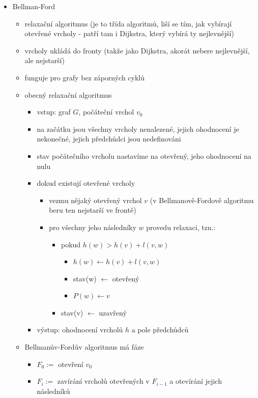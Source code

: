\begin{itemize}
\begin{itemize}
\begin{itemize}
\end{itemize}
\item Bellman-Ford
\begin{itemize}
\item relaxační algoritmus (je to třída algoritmů, liší se tím, jak vybírají otevřené vrcholy - patří tam i Dijkstra, který vybírá ty nejlevnější)
\item vrcholy ukládá do fronty (takže jako Dijkstra, akorát nebere nejlevnější, ale nejstarší)
\item funguje pro grafy bez záporných cyklů
\item obecný relaxační algoritmus
\begin{itemize}
\item vstup: graf $G$, počáteční vrchol $v_0$
\item na začátku jsou všechny vrcholy nenalezené, jejich ohodnocení je nekonečné, jejich předchůdci jsou nedefinováni
\item stav počátečního vrcholu nastavíme na otevřený, jeho ohodnocení na nulu
\item dokud existují otevřené vrcholy
\begin{itemize}
\item vezmu nějaký otevřený vrchol $v$ (v Bellmanově-Fordově algoritmu beru ten nejstarší ve frontě)
\item pro všechny jeho následníky $w$ provedu relaxaci, tzn.:
\begin{itemize}
\item pokud $h(w)\gt h(v)+l(v,w)$
\begin{itemize}
\item $h(w)\leftarrow h(v)+l(v,w)$
\item stav(w) $\leftarrow$ otevřený
\item $P(w)\leftarrow v$
\end{itemize}
\item stav(v) $\leftarrow$ uzavřený
\end{itemize}
\end{itemize}
\item výstup: ohodnocení vrcholů $h$ a pole předchůdců
\end{itemize}
\item Bellmanův-Fordův algoritmus má fáze
\begin{itemize}
\item $F_0:=$ otevření $v_0$
\item $F_i:=$ zavírání vrcholů otevřených v $F_{i-1}$ a otevírání jejich následníků
\end{itemize}

\end{itemize}
\end{itemize}
\end{itemize}
